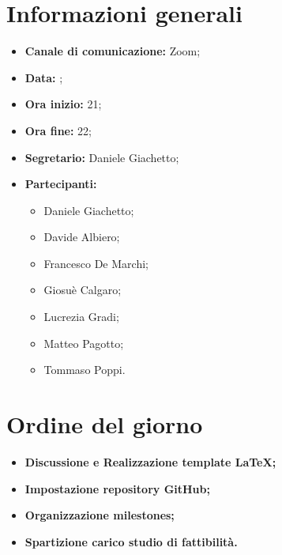 \section{Informazioni generali}

\begin{itemize}

	\item \textbf{Canale di comunicazione:} Zoom;
	
	\item \textbf{Data:} \DataMeeting{};
	
	\item \textbf{Ora inizio:} 21;
	
	\item \textbf{Ora fine:} 22;
	
	\item \textbf{Segretario:} Daniele Giachetto;
	
	\item \textbf{Partecipanti:}
	
		\begin{itemize}
		
			\item Daniele Giachetto;
			\item Davide Albiero;
			\item Francesco De Marchi;
			\item Giosuè Calgaro;
			\item Lucrezia Gradi;
			\item Matteo Pagotto;
			\item Tommaso Poppi.
				 
		\end{itemize}

\end{itemize}

\section{Ordine del giorno}

\begin{itemize}

	\item\textbf{Discussione e Realizzazione template \LaTeX;}

	\item\textbf{Impostazione repository GitHub;}

	\item\textbf{Organizzazione milestones;}

	\item\textbf{Spartizione carico studio di fattibilità.}

\end{itemize}

